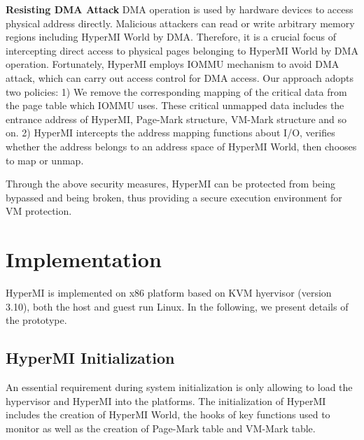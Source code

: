 \documentclass[conference]{IEEEtran}
\begin{document}
\textbf{Resisting DMA Attack}
DMA operation is used by hardware devices to access physical address directly. Malicious attackers can read or write arbitrary memory regions including HyperMI World by DMA. Therefore, it is a crucial focus of intercepting direct access to physical pages belonging to HyperMI World by DMA operation. 
Fortunately, HyperMI employs IOMMU mechanism to avoid DMA attack, which can carry out access control for DMA access. Our approach adopts two policies: 1) We remove the corresponding mapping of the critical data from the page table which IOMMU uses. These critical unmapped data includes the entrance address of HyperMI, Page-Mark structure, VM-Mark structure and so on. 2) HyperMI intercepts the address mapping functions about I/O, verifies whether the address belongs to an address space of HyperMI World, then chooses to map or unmap.


Through the above security measures, HyperMI can be protected from being bypassed and being broken, thus providing a secure execution environment for VM protection.




















\iffalse
\section{Implementation}\label{sec:imp}

HyperMI is implemented on x86 platform based on KVM hyervisor (version 3.10), both the host and guest run Linux. In the following, we present details of the prototype. 

\subsection {HyperMI Initialization}
An essential requirement during system initialization is only allowing to load the hypervisor and HyperMI into the platforms.
The initialization of HyperMI includes the creation of HyperMI World, the hooks of key functions used to monitor as well as the creation of Page-Mark table and VM-Mark table. 
\end{document}
